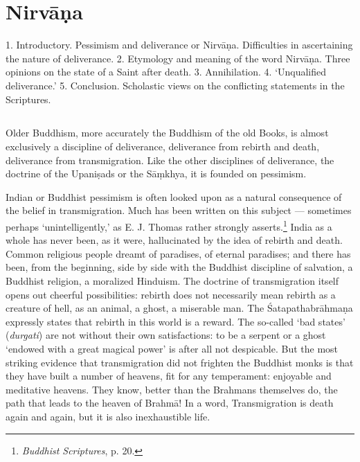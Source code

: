 \documentclass[a4paper, 11pt, oneside, english]{article}
\begin{document}
\section{Nirvāṇa}
\begin{center}\footnotesize
1. Introductory. Pessimism and deliverance or Nirvāṇa. Difficulties in ascertaining the nature of deliverance. 2. Etymology and meaning of the word Nirvāṇa. Three opinions on the state of a Saint after death. 3. Annihilation. 4. `Unqualified deliverance.' 5. Conclusion. Scholastic views on the conflicting statements in the Scriptures.
\end{center}
\subsection{}
\paragraph{}
Older Buddhism, more accurately the Buddhism of the old Books, is almost exclusively a discipline of deliverance, deliverance from rebirth and death, deliverance from transmigration. Like the other disciplines of deliverance, the doctrine of the Upaniṣads or the Sāṃkhya, it is founded on pessimism.

Indian or Buddhist pessimism is often looked upon as a natural consequence of the belief in transmigration. Much has been written on this subject --- sometimes perhaps `unintelligently,' as E. J. Thomas rather strongly asserts.\footnote{\emph{Buddhist Scriptures}, p. 20.} India as a whole has never been, as it were, hallucinated by the idea of rebirth and death. Common religious people dreamt of paradises, of eternal paradises; and there has been, from the beginning, side by side with the Buddhist discipline of salvation, a Buddhist religion, a moralized Hinduism. The doctrine of transmigration itself opens out cheerful possibilities: rebirth does not necessarily mean rebirth as a creature of hell, as an animal, a ghost, a miserable man. The Śatapathabrāhmaṇa expressly states that rebirth in this world is a reward. The so-called `bad states' (\emph{durgati}) are not without their own satisfactions: to be a serpent or a ghost `endowed with a great magical power' is after all not despicable. But the most striking evidence that transmigration did not frighten the Buddhist monks is that they have built a number of heavens, fit for any temperament: enjoyable and meditative heavens. They know, better than the Brahmans themselves do, the path that leads to the heaven of Brahmā! In a word, Transmigration is death again and again, but it is also inexhaustible life.
\end{document}
